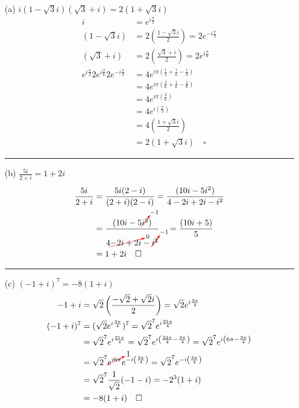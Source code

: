 \documentclass{article}
\newcommand{\canceling}[2]{\textcolor{red}{\cancelto{\textcolor{black}{#1}}{\textcolor{black}{#2}}}}
\begin{document}
\begin{enumerate}
\item[(a)] $i(1-\sqrt{3}i)(\sqrt{3} + i) = 2(1 + \sqrt{3}i)$
  \begin{align*}
    i &= e^{i\frac{\pi}{2}}\\
    (1-\sqrt{3}i) &= 2\left(\frac{1-\sqrt{3}i}{2}\right) = 2e^{-i\frac{\pi}{3}}\\
    (\sqrt{3} + i)&= 2\left(\frac{\sqrt{3} + i}{2}\right) = 2e^{i\frac{\pi}{6}}\\
    e^{i\frac{\pi}{2}}2e^{i\frac{\pi}{6}}2e^{-i\frac{\pi}{3}} &= 4e^{i\pi\left(\frac{1}{2} + \frac{1}{6} - \frac{1}{3}\right)} \\
      &= 4e^{i\pi\left(\frac{3}{6} + \frac{1}{6} - \frac{2}{6}\right)} \\
      &= 4e^{i\pi\left(\frac{2}{6}\right)}\\ 
      &= 4e^{i\left(\frac{\pi}{3}\right)}\\
      &= 4\left(\frac{1+\sqrt{3}i}{2}\right)\\
    &= 2(1+\sqrt{3}i)\quad \square
  \end{align*}
\hrule
\item[(b)] $\frac{5i}{2+i} = 1+2i$
  \begin{align*}
    \frac{5i}{2+i} &= \frac{5i(2-i)}{(2+i)(2-i)} = \frac{(10i-5i^2)}{4 -2i + 2i -i^2} \\
    &= \frac{(10i-5\canceling{-1}{i^2})}{4 \canceling{0}{-2i + 2i} -\canceling{-1}{i^2}} \quad = \frac{(10i+5)}{5} \\
    &= 1 + 2i \quad \square
  \end{align*}
\hrule
\item[(c)] $(-1 + i)^7 = -8(1+i)$
  \begin{align*}
    -1 + i &= \sqrt{2}\left(\frac{-\sqrt{2}+\sqrt{2}i}{2}\right) = \sqrt{2}e^{i\frac{3\pi}{4}}\\
    (-1 + i)^7 &= (\sqrt{2}e^{i\frac{3\pi}{4}})^7 = \sqrt{2}^7e^{i\frac{21\pi}{4}}\\
           &= \sqrt{2}^7e^{i\frac{21\pi}{4}} = \sqrt{2}^7e^{i\left(\frac{24\pi}{4} - \frac{3\pi}{4}\right)} = \sqrt{2}^7e^{i\left(6\pi - \frac{3\pi}{4}\right)} \\
           &= \sqrt{2}^7\canceling{1}{e^{i6\pi}}e^{-i\left(\frac{3\pi}{4}\right)} = \sqrt{2}^7e^{-i\left(\frac{3\pi}{4}\right)} \\
           &= \sqrt{2}^7\frac{1}{\sqrt{2}}(-1-i) = -2^3(1+i) \\
           &= -8(1+i)\quad \square \\

\end{align*}
\end{enumerate}
\end{document}
